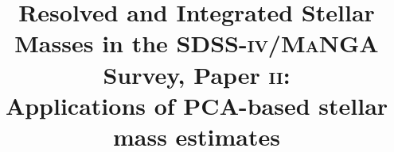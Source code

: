 \documentclass[twocolumn, tighten, trackchanges]{aastex62}
\begin{document}
\title{Resolved and Integrated Stellar Masses in the SDSS-\textsc{iv}/\textsc{MaNGA} Survey, Paper \textsc{ii}: \\ Applications of PCA-based stellar mass estimates}


\end{document}
